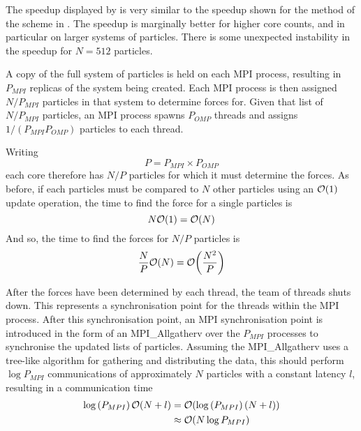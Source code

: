 \vZeroSpeedupExplanation
    {}
    {\sharedandreplicateddata{}}
    {\pairoperation{}}

The speedup displayed by 
is very similar to the speedup shown for the \pairoperation{}
method of the \replicateddata{} scheme in
.
%
The speedup is marginally better for higher core counts, and in
particular on larger systems of particles.
%
There is some unexpected instability in the speedup for $N=512$ particles.


%
A copy of the full system of particles is held on each MPI process,
resulting in $P_{MPI}$ replicas of the system being created.
%
Each MPI process is then assigned $N/P_{MPI}$ particles in that system
to determine forces for.
%
Given that list of $N/P_{MPI}$ particles,
an MPI process spawns $P_{OMP}$ threads
and assigns $1/(P_{MPI} P_{OMP})$ particles to each thread.

Writing
\begin{equation}
    \label{eqn:p_eq_pmpi_pomp}
    P = P_{MPI} \times{} P_{OMP}
\end{equation}
each core therefore has $N/P$ particles
for which it must determine the forces.
%
As before, if each particles must be compared to $N$ other particles
using an $\mathcal{O}{\left({ 1 }\right)}$ update operation, the time to find the force for
a single particles is
\begin{equation}
    N\mathcal{O}{\left({ 1 }\right)} = \mathcal{O}{\left({ N }\right)}
\end{equation}
And so, the time to find the forces for $N/P$ particles is
\begin{equation}
    \label{eqn:shared_and_replicated_calculation_time}
    \frac{N}{P}\mathcal{O}{\left({ N }\right)} = \mathcal{O}{\left({ \frac{N^2}{P} }\right)}
\end{equation}

%
After the forces have been determined by each thread, the team of threads
shuts down.
%
This represents a synchronisation point for the threads within the
MPI process.
%
After this \openmp{} synchronisation point,
an MPI synchronisation point is introduced in the form of
an MPI\_Allgatherv over the $P_{MPI}$ processes
to synchronise the updated lists of particles.
%
Assuming the MPI\_Allgatherv uses a tree-like algorithm for
gathering and distributing the data, this should perform
$\log{P_{MPI}}$ communications of approximately $N$ particles
with a constant latency $l$, resulting in a communication time
\begin{align}
    \log{(P_{MPI})}\,\mathcal{O}{\left({ N + l }\right)} 
        &= \mathcal{O}{\left({ \log{(P_{MPI})}\,(N+l) }\right)} \\
        &\approx{} \mathcal{O}{\left({ N\log{P_{MPI}} }\right)}
        \label{eqn:shared_andreplicated_communication_time}
\end{align}

